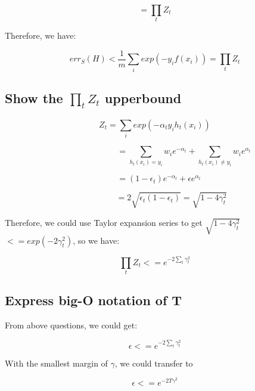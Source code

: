 \documentclass{article} %
\begin{document}
\begin{equation}
= \prod_t Z_t
\end{equation}

Therefore, we have:

\begin{equation}
err_S (H) < \frac{1}{m} \sum_i exp(-y_i f(x_i)) = \prod_t Z_t
\end{equation}


\subsection{Show the $\prod_t Z_t$ upperbound}
\begin{equation}
Z_t = \sum_i exp(-\alpha_t y_i h_t (x_i))
\end{equation}

\begin{equation}
\qquad \qquad \qquad \quad
= \sum_{h_t (x_i) = y_i} w_i e^{-\alpha_t}
+ \sum_{h_t (x_i) \neq y_i} w_i e^{\alpha_t}
\end{equation}

\begin{equation}
\quad
= (1 - \epsilon_t) e^{-\alpha_t} + \epsilon e^{\alpha_t}
\end{equation}

\begin{equation}
\qquad \qquad
= 2 \sqrt{\epsilon_t (1-\epsilon_t)}
= \sqrt{1 - 4 \gamma_t^2}
\end{equation}

Therefore, we could use Taylor expansion series to get $\sqrt{1 - 4 \gamma_t^2}$
$<= exp(-2 \gamma_t^2)$, so we have:

\begin{equation}
\prod_t Z_t <= e^{-2 \sum_t \gamma_t^2}
\end{equation}


\subsection{Express big-O notation of T}
From above questions, we could get:

\begin{equation}
\epsilon <= e^{-2 \sum_t \gamma_t^2}
\end{equation}

With the smallest margin of $\gamma$, we could transfer to

\begin{equation}
\epsilon <= e^{-2 T \gamma^2}
\end{equation}
\end{document}

